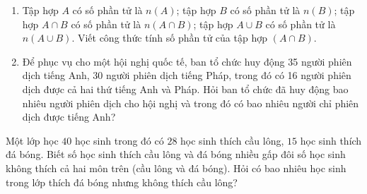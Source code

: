 \begin{bt}%
	\begin{enumerate}
		\item Tập hợp $A$ có số phần tử là $n(A)$; tập hợp $B$ có số phần tử là $n(B)$; tập hợp $A \cap B$ có số phần tử là $n(A \cap B)$; tập hợp $A \cup B$ có số phần tử là $n(A \cup B)$. Viết công thức tính số phần tử của tập hợp $(A \cap B)$.
		\item Để phục vụ cho một hội nghị quốc tế, ban tổ chức huy động 35 người phiên dịch tiếng Anh, 30 người phiên dịch tiếng Pháp, trong đó có 16 người phiên dịch được cả hai thứ tiếng Anh và Pháp. Hỏi ban tổ chức đã huy động bao nhiêu người phiên dịch cho hội nghị và trong đó có bao nhiêu người chỉ phiên dịch được tiếng Anh?
	\end{enumerate}
\end{bt}


\begin{bt}%
	Một lớp học $40$ học sinh trong đó có $28$ học sinh thích cầu lông, $15$ học sinh thích đá bóng. Biết số học sinh thích cầu lông và đá bóng nhiều gấp đôi số học sinh không thích cả hai môn trên (cầu lông và đá bóng). Hỏi có bao nhiêu học sinh trong lớp thích đá bóng nhưng không thích cầu lông?
\end{bt}

